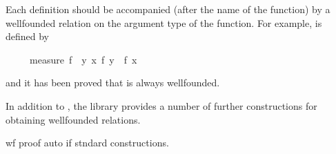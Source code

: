\begin{isabellebody}
\begin{isamarkuptext}
Each  definition should be accompanied (after the
name of the function) by a wellfounded relation on the argument type
of the function. For example,  is defined by
\begin{isabelle}%
\ \ \ \ \ measure\ f\ {\isasymequiv}\ {\isacharbraceleft}{\isacharparenleft}y{\isacharcomma}\ x{\isacharparenright}{\isachardot}\ f\ y\ {\isacharless}\ f\ x{\isacharbraceright}%
\end{isabelle}
and it has been proved that  is always wellfounded.

In addition to , the library provides
a number of further constructions for obtaining wellfounded relations.

wf proof auto if stndard constructions.%
\end{isamarkuptext}%
\end{isabellebody}%
